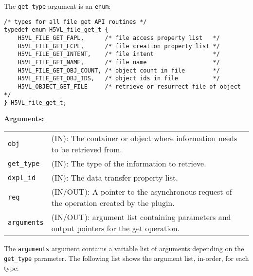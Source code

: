 The {\tt get\_type} argument is an {\tt enum}:
\begin{lstlisting}
/* types for all file get API routines */
typedef enum H5VL_file_get_t {
    H5VL_FILE_GET_FAPL,      /* file access property list   */
    H5VL_FILE_GET_FCPL,      /* file creation property list */
    H5VL_FILE_GET_INTENT,    /* file intent                 */
    H5VL_FILE_GET_NAME,      /* file name                   */
    H5VL_FILE_GET_OBJ_COUNT, /* object count in file        */
    H5VL_FILE_GET_OBJ_IDS,   /* object ids in file          */
    H5VL_OBJECT_GET_FILE     /* retrieve or resurrect file of object */
} H5VL_file_get_t;
\end{lstlisting}

\textbf{Arguments:}\\
\begin{tabular}{l p{10cm}}
  {\tt obj} & (IN): The container or object where information needs to be
  retrieved from.\\
  {\tt get\_type} & (IN): The type of the information to retrieve.\\
  {\tt dxpl\_id} & (IN): The data transfer property list.\\
  {\tt req} & (IN/OUT): A pointer to the asynchronous request of the
  operation created by the plugin.\\
  {\tt arguments} & (IN/OUT): argument list containing parameters and
  output pointers for the get operation. \\
\end{tabular}

The {\tt arguments} argument contains a variable list of arguments
depending on the {\tt get\_type} parameter. The following list shows
the argument list, in-order, for each type:

